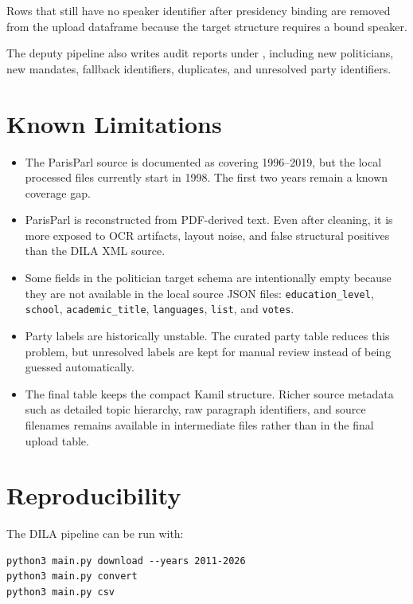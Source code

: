 \documentclass[11pt,a4paper]{article}
\begin{document}
Rows that still have no speaker identifier after presidency binding are removed
from the upload dataframe because the target structure requires a bound speaker.

The deputy pipeline also writes audit reports under
, including new politicians, new mandates,
fallback identifiers, duplicates, and unresolved party identifiers.

\section{Known Limitations}

\begin{itemize}
  \item The ParisParl source is documented as covering 1996--2019, but the
  local processed files currently start in 1998. The first two years remain a
  known coverage gap.
  \item ParisParl is reconstructed from PDF-derived text. Even after cleaning,
  it is more exposed to OCR artifacts, layout noise, and false structural
  positives than the DILA XML source.
  \item Some fields in the politician target schema are intentionally empty
  because they are not available in the local source JSON files:
  \texttt{education\_level}, \texttt{school}, \texttt{academic\_title},
  \texttt{languages}, \texttt{list}, and \texttt{votes}.
  \item Party labels are historically unstable. The curated party table reduces
  this problem, but unresolved labels are kept for manual review instead of
  being guessed automatically.
  \item The final table keeps the compact Kamil structure. Richer source
  metadata such as detailed topic hierarchy, raw paragraph identifiers, and
  source filenames remains available in intermediate files rather than in the
  final upload table.
\end{itemize}

\section{Reproducibility}

The DILA pipeline can be run with:

\begin{verbatim}
python3 main.py download --years 2011-2026
python3 main.py convert
python3 main.py csv
\end{verbatim}
\end{document}
